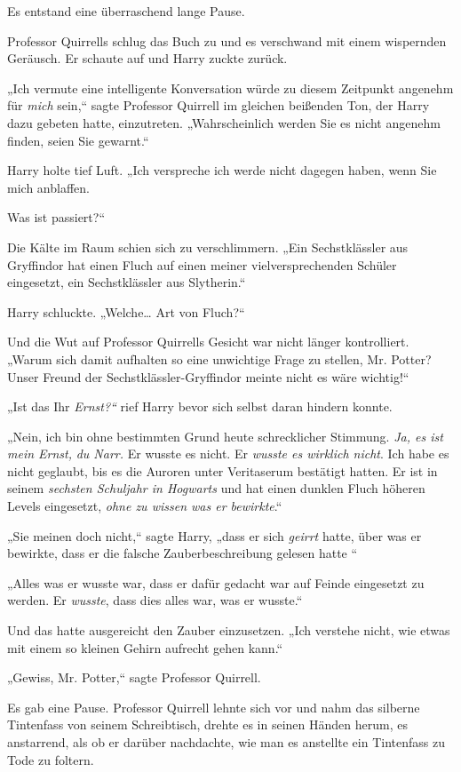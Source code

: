 {Es entstand eine überraschend lange Pause.

Professor Quirrells schlug das Buch zu und es verschwand mit einem wispernden Geräusch. Er schaute auf und Harry zuckte zurück.

„Ich vermute eine intelligente Konversation würde zu diesem Zeitpunkt angenehm für \emph{mich} sein,“ sagte Professor Quirrell im gleichen beißenden Ton, der Harry dazu gebeten hatte, einzutreten. „Wahrscheinlich werden Sie es nicht angenehm finden, seien Sie gewarnt.“

Harry holte tief Luft. „Ich verspreche ich werde nicht dagegen haben, wenn Sie mich anblaffen.

Was ist passiert?“

Die Kälte im Raum schien sich zu verschlimmern. „Ein Sechstklässler aus Gryffindor hat einen Fluch auf einen meiner vielversprechenden Schüler eingesetzt, ein Sechstklässler aus Slytherin.“

Harry schluckte. „Welche… Art von Fluch?“

Und die Wut auf Professor Quirrells Gesicht war nicht länger kontrolliert. „Warum sich damit aufhalten so eine unwichtige Frage zu stellen, Mr. Potter? Unser Freund der Sechstklässler-Gryffindor meinte nicht es wäre wichtig!“

„Ist das Ihr \emph{Ernst?“} rief Harry bevor sich selbst daran hindern konnte.

„Nein, ich bin ohne bestimmten Grund heute schrecklicher Stimmung. \emph{Ja, es ist mein Ernst,} \emph{du Narr.} Er wusste es nicht. Er \emph{wusste es wirklich nicht}. Ich habe es nicht geglaubt, bis es die Auroren unter Veritaserum bestätigt hatten. Er ist in seinem \emph{sechsten Schuljahr in Hogwarts} und hat einen dunklen Fluch höheren Levels eingesetzt, \emph{ohne zu wissen was er bewirkte}.“

„Sie meinen doch nicht,“ sagte Harry, „dass er sich \emph{geirrt} hatte, über was er bewirkte, dass er die falsche Zauberbeschreibung gelesen hatte \later“

„Alles was er wusste war, dass er dafür gedacht war auf Feinde eingesetzt zu werden. Er \emph{wusste}, dass dies alles war, was er wusste.“

Und das hatte ausgereicht den Zauber einzusetzen. „Ich verstehe nicht, wie etwas mit einem so kleinen Gehirn aufrecht gehen kann.“

„Gewiss, Mr. Potter,“ sagte Professor Quirrell.

Es gab eine Pause. Professor Quirrell lehnte sich vor und nahm das silberne Tintenfass von seinem Schreibtisch, drehte es in seinen Händen herum, es anstarrend, als ob er darüber nachdachte, wie man es anstellte ein Tintenfass zu Tode zu foltern.

}
